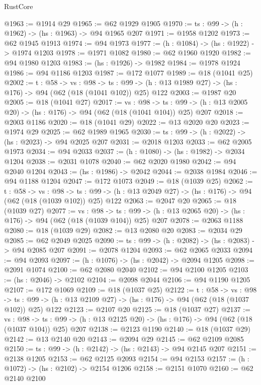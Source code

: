 \begin{lexlean}{RustCore}
\begin{coremodule}
@1963 := @1914 @29
@1965 := @62 @1929 @1905
@1970 := {ts : @99} -> (h : @1962) -> (hs : @1963) -> @94 @1965 @207
@1971 := @1958 @1202
@1973 := @62 @1945 @1913
@1974 := @94 @1973
@1977 := (h : @1084) -> (hs : @1922) -> @1974 @1203
@1978 := @1971 @1082
@1980 := @62 @1960 @1920
@1982 := @94 @1980 @1203
@1983 := (hs : @1926) -> @1982
@1984 := @1978 @1924
@1986 := @94 @1186 @1203
@1987 := @172 @1077
@1989 := @18 (@1041 @25)
@2002 := {t : @58} ->
  {vs : @98} ->
  {ts : @99} -> (h : @13 @1989 @27) -> (hs : @176) -> @94 (@62 (@18 (@1041 @102)) @25) @122
@2003 := @1987 @20
@2005 := @18 (@1041 @27)
@2017 := {vs : @98} ->
  {ts : @99} -> (h : @13 @2005 @20) -> (hs : @176) -> @94 (@62 (@18 (@1041 @104)) @25) @207
@2018 := @2003 @1186
@2020 := @18 (@1041 @29)
@2022 := @13 @2020 @20
@2023 := @1974 @29
@2025 := @62 @1989 @1965
@2030 := {ts : @99} -> (h : @2022) -> (hs : @2023) -> @94 @2025 @207
@2031 := @2018 @1203
@2033 := @62 @2005 @1973
@2034 := @94 @2033
@2037 := (h : @1080) -> (hs : @1982) -> @2034 @1204
@2038 := @2031 @1078
@2040 := @62 @2020 @1980
@2042 := @94 @2040 @1204
@2043 := (hs : @1986) -> @2042
@2044 := @2038 @1984
@2046 := @94 @1188 @1204
@2047 := @172 @1073
@2049 := @18 (@1039 @25)
@2062 := {t : @58} ->
  {vs : @98} ->
  {ts : @99} -> (h : @13 @2049 @27) -> (hs : @176) -> @94 (@62 (@18 (@1039 @102)) @25) @122
@2063 := @2047 @20
@2065 := @18 (@1039 @27)
@2077 := {vs : @98} ->
  {ts : @99} -> (h : @13 @2065 @20) -> (hs : @176) -> @94 (@62 (@18 (@1039 @104)) @25) @207
@2078 := @2063 @1188
@2080 := @18 (@1039 @29)
@2082 := @13 @2080 @20
@2083 := @2034 @29
@2085 := @62 @2049 @2025
@2090 := {ts : @99} -> (h : @2082) -> (hs : @2083) -> @94 @2085 @207
@2091 := @2078 @1204
@2093 := @62 @2065 @2033
@2094 := @94 @2093
@2097 := (h : @1076) -> (hs : @2042) -> @2094 @1205
@2098 := @2091 @1074
@2100 := @62 @2080 @2040
@2102 := @94 @2100 @1205
@2103 := (hs : @2046) -> @2102
@2104 := @2098 @2044
@2106 := @94 @1190 @1205
@2107 := @172 @1069
@2109 := @18 (@1037 @25)
@2122 := {t : @58} ->
  {vs : @98} ->
  {ts : @99} -> (h : @13 @2109 @27) -> (hs : @176) -> @94 (@62 (@18 (@1037 @102)) @25) @122
@2123 := @2107 @20
@2125 := @18 (@1037 @27)
@2137 := {vs : @98} ->
  {ts : @99} -> (h : @13 @2125 @20) -> (hs : @176) -> @94 (@62 (@18 (@1037 @104)) @25) @207
@2138 := @2123 @1190
@2140 := @18 (@1037 @29)
@2142 := @13 @2140 @20
@2143 := @2094 @29
@2145 := @62 @2109 @2085
@2150 := {ts : @99} -> (h : @2142) -> (hs : @2143) -> @94 @2145 @207
@2151 := @2138 @1205
@2153 := @62 @2125 @2093
@2154 := @94 @2153
@2157 := (h : @1072) -> (hs : @2102) -> @2154 @1206
@2158 := @2151 @1070
@2160 := @62 @2140 @2100

\end{coremodule}
\end{lexlean}
